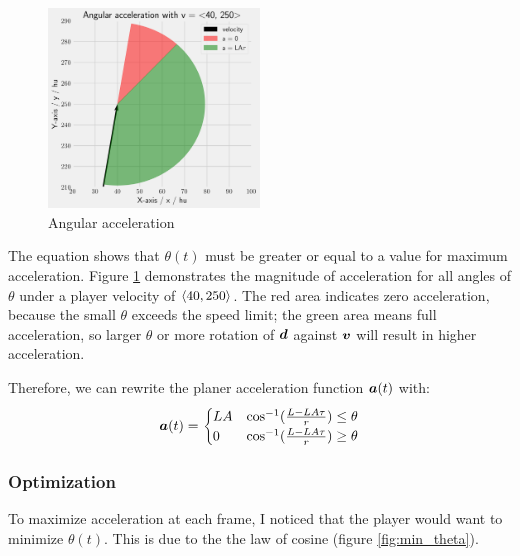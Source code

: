 \begin{figure}[H]
    \centering
    \includegraphics[width=0.5\textwidth]{assets/angular_acceleration_limiting.png}
    \caption{Angular acceleration}
    \label{fig:angular_acceleration_limiting}
\end{figure}

The equation shows that $\theta(t)$ must be greater or equal to a value for maximum acceleration. Figure \ref{fig:angular_acceleration_limiting} demonstrates the magnitude of acceleration for all angles of $\theta$ under a player velocity of $\left\langle 40, 250 \right\rangle$. The red area indicates zero acceleration, because the small $\theta$ exceeds the speed limit; the green area means full acceleration, so larger $\theta$ or more rotation of $\boldsymbol{d}$ against $\boldsymbol{v}$ will result in higher acceleration.

Therefore, we can rewrite the planer acceleration function $\boldsymbol{a}(t)$ with:
\[
\boldsymbol{a}(t) = \begin{cases}
    LA & \cos^{-1}(\frac{L - LA\tau}{r}) \le \theta\\
    0 & \cos^{-1}(\frac{L - LA\tau}{r}) \geq \theta
\end{cases}
\]


\subsubsection{Optimization}
To maximize acceleration at each frame, I noticed that the player would want to minimize $\theta(t)$. This is due to the the law of cosine (figure \ref{fig:min_theta}).

